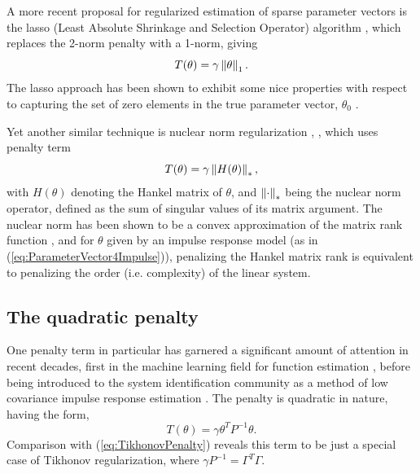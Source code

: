 A more recent proposal for regularized estimation of sparse parameter vectors is the lasso (Least Absolute Shrinkage and Selection Operator) algorithm \cite{Tibshirani1996}, which replaces the 2-norm penalty with a 1-norm, giving
\begin{equation}
T(\theta) = \gamma \left\lVert\theta\right\rVert_1.
\end{equation}
The lasso approach has been shown to exhibit some nice properties with respect to capturing the set of zero elements in the true parameter vector, $\theta_0$ \cite{Tropp2006}. 

Yet another similar technique is nuclear norm regularization \cite{Fazel2001}, \cite{Mohan2010}, which uses penalty term
\begin{equation}
T(\theta) = \gamma \left\lVert H(\theta)\right\rVert_*,
\end{equation}
with $H(\theta)$ denoting the Hankel matrix of $\theta$, and $\left\lVert\cdot\right\rVert_*$ being the nuclear norm operator, defined as the sum of singular values of its matrix argument. The nuclear norm has been shown to be a convex approximation of the matrix rank function \cite{Fazel2001}, and for $\theta$ given by an impulse response model (as in (\ref{eq:ParameterVector4Impulse})), penalizing the Hankel matrix rank is equivalent to penalizing the order (i.e. complexity) of the linear system.

\subsection{The quadratic penalty}

One penalty term in particular has garnered a significant amount of attention in recent decades, first in the machine learning field for function estimation \cite{Rasmussen2006}, before being introduced to the system identification community as a method of low covariance impulse response estimation \cite{Pillonetto2010}. The penalty is quadratic in nature, having the form,
\begin{equation}
T(\theta) = \gamma \theta^T P^{-1} \theta.
\label{eq:QuadraticPenaltyT}
\end{equation}
Comparison with (\ref{eq:TikhonovPenalty}) reveals this term to be just a special case of Tikhonov regularization, where $\gamma P^{-1} = \Gamma^T \Gamma$. 

